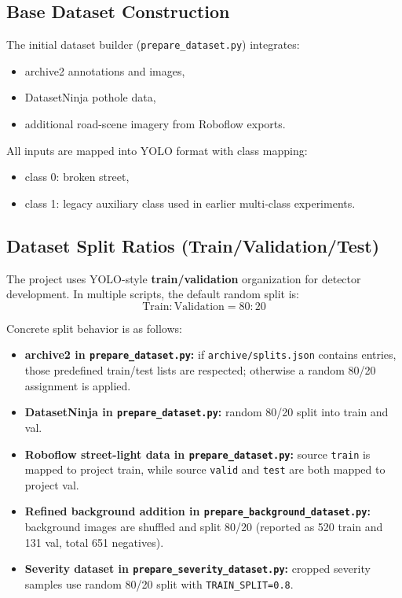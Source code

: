 \documentclass[twocolumn]{article}
\begin{document}
\subsection{Base Dataset Construction}
The initial dataset builder (\texttt{prepare\_dataset.py}) integrates:
\begin{itemize}
    \item archive2 annotations and images,
    \item DatasetNinja pothole data,
    \item additional road-scene imagery from Roboflow exports.
\end{itemize}
All inputs are mapped into YOLO format with class mapping:
\begin{itemize}
    \item class 0: broken street,
    \item class 1: legacy auxiliary class used in earlier multi-class experiments.
\end{itemize}

\subsection{Dataset Split Ratios (Train/Validation/Test)}
The project uses YOLO-style \textbf{train/validation} organization for detector development. In multiple scripts, the default random split is:
\[
\text{Train} : \text{Validation} = 80:20
\]

Concrete split behavior is as follows:
\begin{itemize}
    \item \textbf{archive2 in \texttt{prepare\_dataset.py}:} if \texttt{archive/splits.json} contains entries, those predefined train/test lists are respected; otherwise a random 80/20 assignment is applied.
    \item \textbf{DatasetNinja in \texttt{prepare\_dataset.py}:} random 80/20 split into train and val.
    \item \textbf{Roboflow street-light data in \texttt{prepare\_dataset.py}:} source \texttt{train} is mapped to project train, while source \texttt{valid} and \texttt{test} are both mapped to project val.
    \item \textbf{Refined background addition in \texttt{prepare\_background\_dataset.py}:} background images are shuffled and split 80/20 (reported as 520 train and 131 val, total 651 negatives).
    \item \textbf{Severity dataset in \texttt{prepare\_severity\_dataset.py}:} cropped severity samples use random 80/20 split with \texttt{TRAIN\_SPLIT=0.8}.
\end{itemize}
\end{document}
